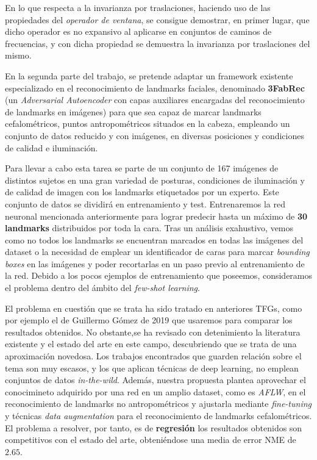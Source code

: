 \medskip

\noindent En lo que respecta a la invarianza por traslaciones, haciendo uso de las propiedades del \textit{operador de ventana}, se consigue demostrar, en primer lugar, que dicho operador es no expansivo al aplicarse en conjuntos de caminos de frecuencias, y con dicha propiedad se demuestra la invarianza por traslaciones del mismo.

\medskip

\noindent En la segunda parte del trabajo, se pretende adaptar un framework existente especializado en el reconocimiento de landmarks faciales, denominado \textbf{3FabRec} (un \textit{Adversarial Autoencoder} con capas auxiliares encargadas del reconocimiento de landmarks en imágenes) para que sea capaz de marcar landmarks cefalométricos, puntos antropométricos situados en la cabeza, empleando un conjunto de datos reducido y con imágenes, en diversas posiciones y condiciones de calidad e iluminación.

\medskip

\noindent Para llevar a cabo esta tarea se parte de un conjunto de 167 imágenes de distintos sujetos en una gran variedad de posturas, condiciones de iluminación y de calidad de imagen con los landmarks etiquetados por un experto. Este conjunto de datos se dividirá en entrenamiento y test. Entrenaremos la red neuronal mencionada anteriormente para lograr predecir hasta un máximo de \textbf{30 landmarks} distribuidos por toda la cara. Tras un análisis exahustivo, vemos como no todos los landmarks se encuentran marcados en todas las imágenes del dataset o la necesidad de emplear un identificador de caras para marcar \textit{bounding boxes} en las imágenes y poder recortarlas en un paso previo al entrenamiento de la red. Debido a los pocos ejemplos de entrenamiento que poseemos, consideramos el problema dentro del ámbito del \textit{few-shot learning}.

\medskip

\noindent El problema en cuestión que se trata ha sido tratado en anteriores TFGs, como por ejemplo el de Guillermo Gómez de 2019 que usaremos para comparar los resultados obtenidos. No obstante,se ha revisado con detenimiento la literatura existente y el estado del arte en este campo, descubriendo que se trata de una aproximación novedosa. Los trabajos encontrados que guarden relación sobre el tema son muy escasos, y los que aplican técnicas de deep learning, no emplean conjuntos de datos \textit{in-the-wild}. Además, nuestra propuesta plantea aprovechar el conocimineto adquirido por una red en un amplio dataset, como es \textit{AFLW}, en el reconocimiento de landmarks no antropométricos y ajustarla mediante \textit{fine-tuning}  y técnicas \textit{data augmentation}  para el reconocimiento de landmarks cefalométricos. El problema a resolver, por tanto, es de \textbf{regresión} los resultados obtenidos son competitivos con el estado del arte, obteniéndose una media de error NME de $2.65$.

